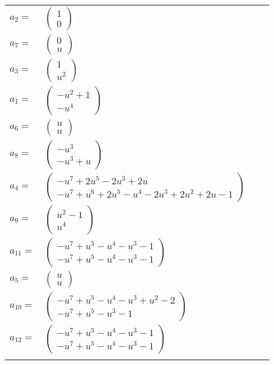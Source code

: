 \documentclass[1p]{elsarticle_modified}
\theoremstyle{definition}
\begin{document}
\begin{tabular}{m{7pt} m{180pt} m{7pt} m{180pt} }
\flushright $a_{2}=$&$\begin{pmatrix}1\\0\end{pmatrix}$ \\
\flushright $a_{7}=$&$\begin{pmatrix}0\\u\end{pmatrix}$ \\
\flushright $a_{3}=$&$\begin{pmatrix}1\\u^2\end{pmatrix}$ \\
\flushright $a_{1}=$&$\begin{pmatrix}- u^2+1\\- u^4\end{pmatrix}$ \\
\flushright $a_{6}=$&$\begin{pmatrix}u\\u\end{pmatrix}$ \\
\flushright $a_{8}=$&$\begin{pmatrix}- u^3\\- u^3+u\end{pmatrix}$ \\
\flushright $a_{4}=$&$\begin{pmatrix}- u^7+2 u^5-2 u^3+2 u\\- u^7+u^6+2 u^5- u^4-2 u^3+2 u^2+2 u-1\end{pmatrix}$ \\
\flushright $a_{9}=$&$\begin{pmatrix}u^2-1\\u^4\end{pmatrix}$ \\
\flushright $a_{11}=$&$\begin{pmatrix}- u^7+u^5- u^4- u^3-1\\- u^7+u^5- u^4- u^3-1\end{pmatrix}$ \\
\flushright $a_{5}=$&$\begin{pmatrix}u\\u\end{pmatrix}$ \\
\flushright $a_{10}=$&$\begin{pmatrix}- u^7+u^5- u^4- u^3+u^2-2\\- u^7+u^5- u^3-1\end{pmatrix}$ \\
\flushright $a_{12}=$&$\begin{pmatrix}- u^7+u^5- u^4- u^3-1\\- u^7+u^5- u^4- u^3-1\end{pmatrix}$\\&\end{tabular}
\end{document}

